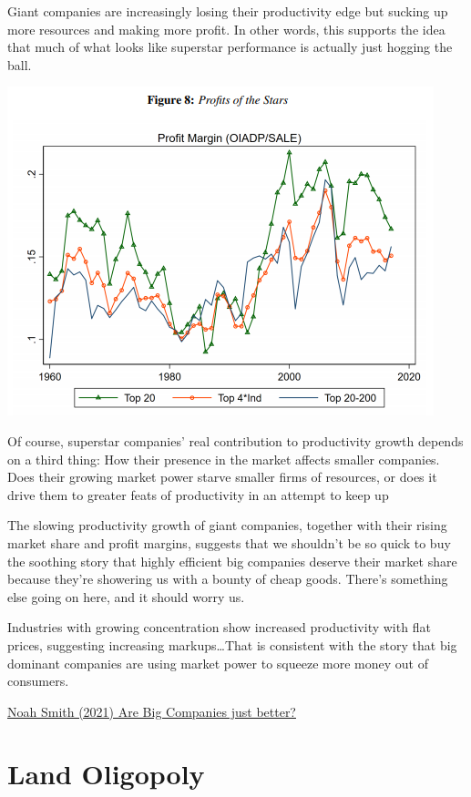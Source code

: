 \documentclass[
]{book}
\begin{document}
Giant companies are increasingly losing their productivity edge but sucking up more resources and making more profit. In other words, this supports the idea that much of what looks like superstar performance is actually just hogging the ball.

\includegraphics{fig/superstars_profit.png}

Of course, superstar companies' real contribution to productivity growth depends on a third thing: How their presence in the market affects smaller companies. Does their growing market power starve smaller firms of resources, or does it drive them to greater feats of productivity in an attempt to keep up

The slowing productivity growth of giant companies, together with their rising market share and profit margins, suggests that we shouldn't be so quick to buy the soothing story that highly efficient big companies deserve their market share because they're showering us with a bounty of cheap goods. There's something else going on here, and it should worry us.

Industries with growing concentration show increased productivity with flat prices, suggesting increasing markups\ldots That is consistent with the story that big dominant companies are using market power to squeeze more money out of consumers.

\href{https://noahpinion.substack.com/p/are-big-companies-just-better}{Noah Smith (2021) Are Big Companies just better?}

\hypertarget{land-oligopoly}{%
\section{Land Oligopoly}\label{land-oligopoly}}
\end{document}
